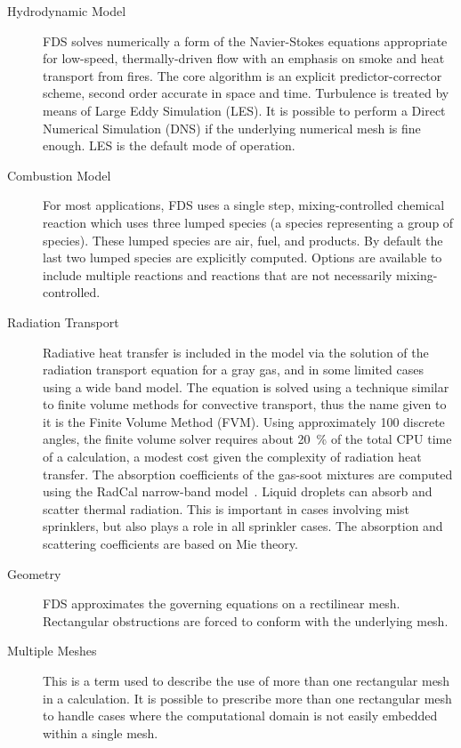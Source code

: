 \documentclass[11pt]{book}
\begin{document}
\begin{description}
\item[Hydrodynamic Model]
FDS solves numerically a form of the Navier-Stokes equations appropriate
for low-speed, thermally-driven flow with an emphasis on
smoke and heat transport from fires. The core algorithm is an
explicit predictor-corrector scheme, second order accurate in space
and time. Turbulence is treated by means of Large Eddy Simulation (LES). It is possible to perform a Direct
Numerical Simulation (DNS) if the underlying numerical mesh is fine
enough. LES is the default mode of operation.

\item[Combustion Model]
For most applications, FDS uses a single step, mixing-controlled chemical reaction which uses three lumped species (a species representing a group of species).
These lumped species are air, fuel, and products. By default the last two lumped species are explicitly
computed. Options are available to include multiple reactions and reactions that are not necessarily mixing-controlled.

\item[Radiation Transport] Radiative heat transfer is included in the
model via the solution of the radiation transport equation for a
gray gas, and in some limited cases using a wide band
model.  The equation is solved using a technique similar to finite
volume methods for convective transport, thus the name given to it is
the Finite Volume Method (FVM).  Using approximately 100 discrete
angles, the finite volume solver requires about 20~\% of the total CPU
time of a calculation, a modest cost given the complexity of radiation
heat transfer. The absorption coefficients of the gas-soot mixtures
are computed using the RadCal narrow-band model~\cite{RadCal}.  Liquid droplets can
absorb and scatter thermal radiation. This is important in cases
involving mist sprinklers, but also plays a role in all sprinkler
cases.  The absorption and scattering coefficients are based on Mie
theory.

\item[Geometry]
FDS approximates the governing equations on a rectilinear mesh.
Rectangular obstructions are forced to conform with the underlying mesh.

\item[Multiple Meshes] This is a term used to describe the use of
more than one rectangular mesh in a calculation. It is possible to prescribe
more than one rectangular mesh to handle cases where the computational
domain is not easily embedded within a single mesh.


\end{description}
\end{document}
